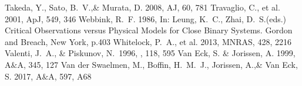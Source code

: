 \documentclass[a4paper,fleqn,usenatbib]{mnras}
\begin{document}
\begin{thebibliography}{99}
Takeda, Y., Sato, B.~V.,\& Murata, D. 2008, 
AJ, 60, 781
Travaglio, C., et al. 2001, 
ApJ, 549, 346
Webbink, R.~F. 1986, 
In: Leung, K.~C., Zhai, D.~S.(eds.) Critical Observations versus Physical Models for Close Binary Systems. Gordon and Breach, New York, p.403
Whitelock, P.~A., et al. 2013, 
MNRAS, 428, 2216
 Valenti, J.~A., \& Piskunov, N.\ 1996, \aaps, 118, 595 
Van Eck, S. \& Jorissen, A. 1999, 
A$\&$A, 345, 127
Van der Swaelmen, M., Boffin, H.~M.~J., Jorissen, A.,\& Van Eck, S. 2017, 
A$\&$A, 597, A68
\end{thebibliography}
\bsp	%
\label{lastpage}
\end{document}
